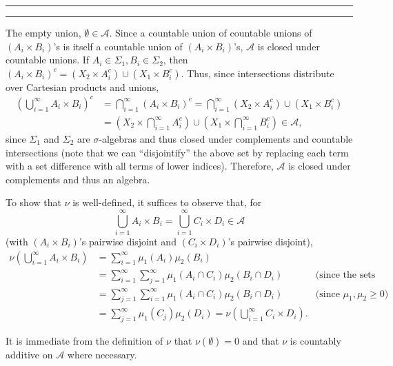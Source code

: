 \documentclass[11pt]{article}
\newcounter{questionCounter}
\newcounter{partCounter}[questionCounter]
\newenvironment{question}[2][\arabic{questionCounter}]{%
    \setcounter{partCounter}{0}%
    \vspace{.25in} \hrule \vspace{0.5em}%
        \noindent{\bf #2}%
    \vspace{0.8em} \hrule \vspace{.10in}%
    \addtocounter{questionCounter}{1}%
}{}
\begin{document}
\begin{question}{Problem 5}
\begin{enumerate}[(a)]
The empty union, $\emptyset \in \mathcal{A}$.
Since a countable union of countable unions of $(A_i \times B_i)$'s is itself
a countable union of $(A_i \times B_i)$'s, $\mathcal{A}$ is closed under
countable unions.
If $A_i \in \Sigma_1,B_i \in \Sigma_2$, then
$(A_i \times B_i)^c = (X_2 \times A_i^c) \cup (X_1 \times B_i^c)$. Thus, since
intersections distribute over Cartesian products and unions,
\begin{align*}
\left( \bigcup_{i = 1}^{\infty} A_i \times B_i \right)^c
 & =   \bigcap_{i = 1}^{\infty} (A_i \times B_i)^c
   =   \bigcap_{i = 1}^{\infty} (X_2 \times A_i^c) \cup (X_1 \times B_i^c) \\
 & =   \left( X_2 \times \bigcap_{i = 1}^{\infty} A_i^c \right)
         \cup
       \left( X_1 \times \bigcap_{i = 1}^{\infty} B_i^c \right)
   \in \mathcal{A},
\end{align*}
since $\Sigma_1$ and $\Sigma_2$ are $\sigma$-algebras and thus closed under
complements and countable intersections (note that we can ``disjointify'' the
above set by replacing each term with a set difference with all terms of lower
indices). Therefore, $\mathcal{A}$ is closed under complements and thus an
algebra.

To show that $\nu$ is well-defined, it suffices to observe that, for
\[\bigcup_{i = 1}^{\infty} A_i \times B_i
 = \bigcup_{i = 1}^{\infty} C_i \times D_i \in \mathcal{A}\]
(with $(A_i \times B_i)$'s pairwise disjoint and $(C_i \times D_i)$'s pairwise
disjoint),
\begin{align*}
\nu\left( \bigcup_{i = 1}^{\infty} A_i \times B_i \right)
 & = \sum_{i = 1}^{\infty} \mu_1(A_i)\mu_2(B_i) \\
 & = \sum_{i = 1}^{\infty}
     \sum_{j = 1}^{\infty} \mu_1(A_i \cap C_i)\mu_2(B_i \cap D_i)
                                & \mbox{(since the sets are disjoint sets)} \\
 & = \sum_{j = 1}^{\infty}
     \sum_{i = 1}^{\infty} \mu_1(A_i \cap C_i)\mu_2(B_i \cap D_i)
                                & \mbox{(since $\mu_1,\mu_2 \geq 0$)} \\
 & = \sum_{j = 1}^{\infty} \mu_1(C_j)\mu_2(D_i)
   = \nu\left( \bigcup_{i = 1}^{\infty} C_i \times D_i \right).
\end{align*}

It is immediate from the definition of $\nu$ that $\nu(\emptyset) = 0$ and
that $\nu$ is countably additive on $\mathcal{A}$ where necessary.

\end{enumerate}
\end{question}
\end{document}

